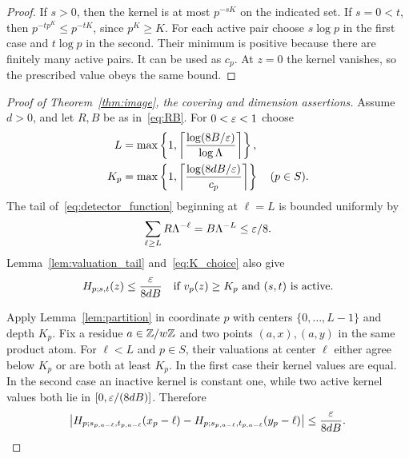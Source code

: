 \begin{proof}
If $s>0$, then the kernel is at most $p^{-sK}$ on the indicated set.
If $s=0<t$, then
$p^{-tp^K}\leq p^{-tK}$, since $p^K\geq K$.
For each active pair choose $s\log p$ in the first case and $t\log p$
in the second. Their minimum is positive because there are finitely many
active pairs. It can be used as $c_p$. At $z=0$ the kernel vanishes,
so the prescribed value obeys the same bound.
\end{proof}

\begin{proof}[Proof of Theorem~\ref{thm:image}, the covering and dimension assertions]
Assume $d>0$, and let $R,B$ be as in~\eqref{eq:RB}. For $0<\varepsilon<1$ choose
\begin{align}
 L&=\max\left\{1,\left\lceil
                \frac{\log(8B/\varepsilon)}{\log\Lambda}
               \right\rceil\right\},\label{eq:L_choice}\\
 K_p&=\max\left\{1,\left\lceil
                    \frac{\log(8dB/\varepsilon)}{c_p}
                   \right\rceil\right\}\quad(p\in S).
                   \label{eq:K_choice}
\end{align}
The tail of~\eqref{eq:detector_function} beginning at $\ell=L$ is bounded
uniformly by
\begin{equation}\label{eq:series_tail}
 \sum_{\ell\geq L}R\Lambda^{-\ell}
   =B\Lambda^{-L}\leq\varepsilon/8.
\end{equation}
Lemma~\ref{lem:valuation_tail} and~\eqref{eq:K_choice} also give
\begin{equation}\label{eq:small_kernel}
 H_{p;s,t}(z)\leq\frac{\varepsilon}{8dB}
 \quad\text{if }v_p(z)\geq K_p\text{ and }(s,t)\text{ is active}.
\end{equation}

Apply Lemma~\ref{lem:partition} in coordinate $p$ with centers
$\{0,\ldots,L-1\}$ and depth $K_p$. Fix a residue $a\in\mathbb Z/w\mathbb Z$ and
two points $(a,x),(a,y)$ in the same product atom. For $\ell<L$ and
$p\in S$, their valuations at center $\ell$ either agree below $K_p$
or are both at least $K_p$. In the first case their kernel values are
equal. In the second case an inactive kernel is constant one, while two
active kernel values both lie in $[0,\varepsilon/(8dB)]$. Therefore
\begin{equation}\label{eq:coordinate_variation}
 \left|H_{p;s_{p,a-\ell},t_{p,a-\ell}}(x_p-\ell)
       -H_{p;s_{p,a-\ell},t_{p,a-\ell}}(y_p-\ell)\right|
 \leq\frac{\varepsilon}{8dB}.
\end{equation}


\end{proof}
